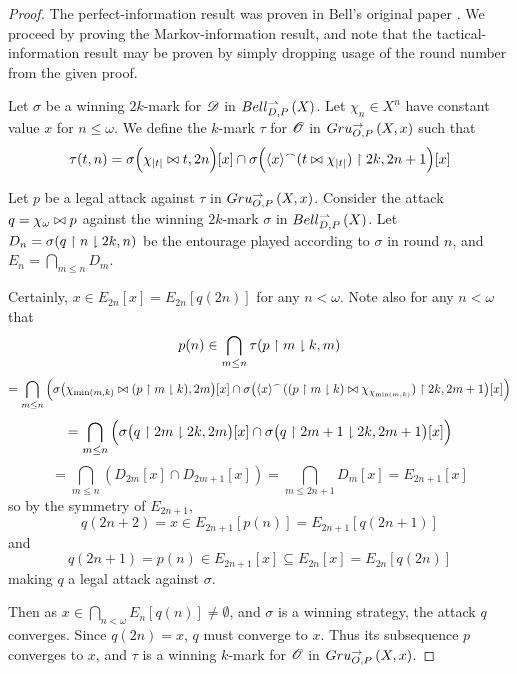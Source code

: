 \documentclass{amsart}
\theoremstyle{definition}
\begin{document}
  \begin{proof}
    The perfect-information result was proven in Bell's
    original paper \cite{MR3239205}. We proceed by proving the
    Markov-information result, and note that the tactical-information
    result may be proven by simply dropping usage of
    the round number from the given proof.

    Let \(\sigma\) be a winning \(2k\)-mark for \(\mathscr{D}\) in
    \(Bell_{D,P}^{\rightharpoonup}\left({X}\right)\).
    Let \(\chi_n\in X^n\) have constant value \(x\) for \(n\leq\omega\).
    We define the \(k\)-mark \(\tau\) for \(\mathscr{O}\) in
    \(Gru_{O,P}^{\to}\left({X},{x}\right)\) such that
      \[
        \tau(t,n)
          =
        \sigma\Big(
          \chi_{|t|} \bowtie t
        ,2n\Big)[x]
        \cap
        \sigma\Big(
          \langle x\rangle {^\frown}(t\bowtie\chi_{|t|}) \restriction 2k
        ,2n+1\Big)[x]
      \]

    Let \(p\) be a legal attack against \(\tau\) in \(Gru_{O,P}^{\to}\left({X},{x}\right)\).
    Consider the attack \(q=\chi_\omega\bowtie p\) against the winning
    \(2k\)-mark \(\sigma\) in \(Bell_{D,P}^{\rightharpoonup}\left({X}\right)\).
    Let \(D_n=\sigma(q\restriction n\downharpoonright 2k,n)\) be the entourage played according
    to \(\sigma\) in round \(n\), and \(E_n=\bigcap_{m\leq n}D_m\).

    Certainly, $x\in E_{2n}[x]= E_{2n}[q(2n)]$ for any $n<\omega$.
    Note also for any $n<\omega$ that
        \[
          p(n) \in
          \bigcap_{m\leq n}\tau(p\restriction m\downharpoonright k, m)
        \]
        \[
          =
          \bigcap_{m\leq n}\Big(
            \sigma\big(
              \chi_{\min(m,k)} \bowtie (p\restriction m\downharpoonright k)
            ,2m\big)[x]
            \cap
            \sigma\big(
              \langle x\rangle {^\frown}((p\restriction m\downharpoonright k)\bowtie
              \chi_{\chi_{\min(m,k)}}) \restriction 2k
            ,2m+1\big)[x]
          \Big)
        \]
        \[
          =
          \bigcap_{m\leq n}\Big(
            \sigma\big(
              q\restriction 2m\downharpoonright 2k
            ,2m\big)[x]
            \cap
            \sigma\big(
              q\restriction 2m+1\downharpoonright 2k
            ,2m+1\big)[x]
          \Big)
        \]
        \[
          =
          \bigcap_{m\leq n}\left(
            D_{2m}[x]\cap
            D_{2m+1}[x]
          \right) =
          \bigcap_{m\leq 2n+1} D_m[x]=E_{2n+1}[x]
        \]
    so by the symmetry of \(E_{2n+1}\),
      \[
        q(2n+2)=x\in E_{2n+1}[p(n)]= E_{2n+1}[q(2n+1)]
      \]
    and
      \[
        q(2n+1)=p(n)\in E_{2n+1}[x]\subseteq E_{2n}[x]=E_{2n}[q(2n)]
      \]
    making \(q\) a legal attack against \(\sigma\).

    Then as \(x\in \bigcap_{n<\omega} E_n[q(n)]\not=\emptyset\),
    and \(\sigma\) is a winning strategy, the attack $q$ converges.
    Since \(q(2n)=x\), \(q\) must converge to \(x\). Thus its subsequence
    \(p\) converges to \(x\), and \(\tau\)
    is a winning \(k\)-mark for \(\mathscr{O}\) in \(Gru_{O,P}^{\to}\left({X},{x}\right)\).
  \end{proof}
\end{document}

